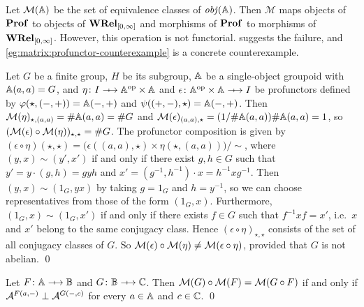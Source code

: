 Let \( \mathcal{M}(\mathbb{A}) \) be the set of equivalence classes of \( \mathit{obj}(\mathbb{A}) \). 
Then \( \mathcal{M} \) maps objects of \( \mathbf{Prof} \) to objects of \( \mathbf{WRel}_{[0,\infty]} \) and morphisms of \( \mathbf{Prof} \) to morphisms of \( \mathbf{WRel}_{[0,\infty]} \).
However, this operation is not functorial.
 suggests the failure, and \cref{eg:matrix:profunctor-counterexample} is a concrete counterexample.


\newcommand{\TerminalCategory}{I}
\begin{example}\label{eg:matrix:profunctor-counterexample}
    Let \( G \) be a finite group, \( H \) be its subgroup, \( \mathbb{A} \) be a single-object groupoid with \( \mathbb{A}(a, a) = G \), and \( \eta \colon \TerminalCategory \profarrow \Grp^{\op} \times \Grp \) and \( \epsilon \colon \Grp^{\op} \times \Grp \profarrow \TerminalCategory \) be profunctors defined by \( \varphi(\star, ({-}, {+})) = \mathbb{A}({-}, {+}) \) and \( \psi(({+}, {-}), \star) = \mathbb{A}({-}, {+}) \).
    Then \( \mathcal{M}({\eta})_{\star, (a,a)} = \#\mathbb{A}(a,a) = \#G \) and \( \mathcal{M}({\epsilon})_{(a,a), \star} = (1/\#\mathbb{A}(a,a))\#\mathbb{A}(a,a) = 1 \), so \( (\mathcal{M}({\epsilon}) \circ \mathcal{M}({\eta}))_{\star, \star} = \#G \).
    The profunctor composition is given by \( (\epsilon \circ \eta)(\star, \star) = \big( \epsilon((a,a), \star) \times \eta(\star, (a,a)) \big) / {\sim} \), where \( (y, x) \sim (y', x') \) if and only if there exist \( g, h \in G \) such that \( y' = y \cdot (g,h) = g y h \) and \( x' = (g^{-1}, h^{-1}) \cdot x = h^{-1} x g^{-1} \).
    Then \( (y, x) \sim (1_G, yx) \) by taking \( g = 1_G \) and \( h = y^{-1} \), so we can choose representatives from those of the form \( (1_G, x) \).
    Furthermore, \( (1_G, x) \sim (1_G, x') \) if and only if there exists \( f \in G \) such that \( f^{-1} x f = x' \), i.e.~\( x \) and \( x' \) belong to the same conjugacy class.
    Hence \( (\epsilon \circ \eta)_{\star, \star} \) consists of the set of all conjugacy classes of \( G \).
    So \( \mathcal{M}({\epsilon}) \circ \mathcal{M}({\eta}) \neq \mathcal{M}({\epsilon \circ \eta}) \), provided that \( G \) is not abelian.
    \qed
\end{example}

\begin{theorem}
    Let \( F \colon \Grp \profarrow \Grpb \) and \( G \colon \Grpb \profarrow \Grpc \).
    Then \( \mathcal{M}({G}) \circ \mathcal{M}({F}) = \mathcal{M}({G \circ F}) \) if and only if \( \mathcal{A}^{F(a, {-})} \mathrel{\bot} \mathcal{A}^{G({-}, c)} \) for every \( a \in \mathbb{A} \) and \( c \in \mathbb{C} \).
    \qed
\end{theorem}


